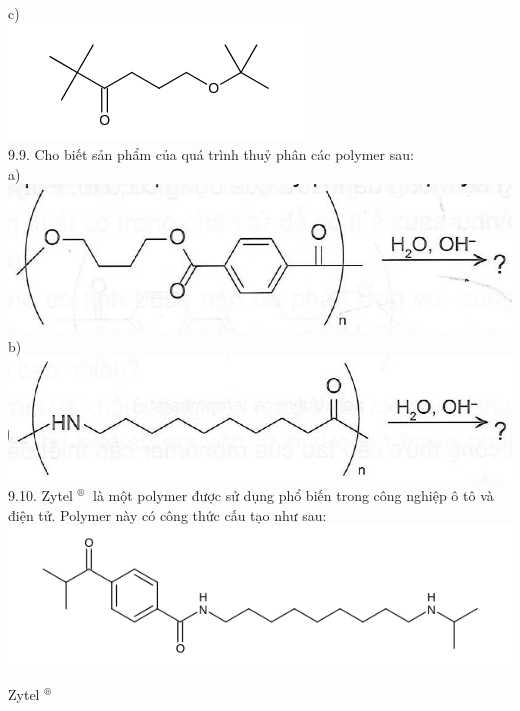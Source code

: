 \documentclass[10pt]{article}
\begin{document}
c)\\
\includegraphics{smile-c56ab57f43c58433dadfc2143fb991ae12c1b9cd}\\
9.9. Cho biết sản phẩm của quá trình thuỷ phân các polymer sau:\\
a)\\
\includegraphics[max width=\textwidth, center]{2025_10_23_de6f5713836e4e91b3c8g-066(2)}\\
b)\\
\includegraphics[max width=\textwidth, center]{2025_10_23_de6f5713836e4e91b3c8g-066}\\
9.10. Zytel ${ }^{\text {® }}$ là một polymer được sử dụng phổ biến trong công nghiệp ô tô và điện tử. Polymer này có công thức cấu tạo như sau:\\
\includegraphics{smile-6240d26ca1193131f6f22600ee7e6c18fe3cbde6}

Zytel ${ }^{\text {® }}$
\end{document}
